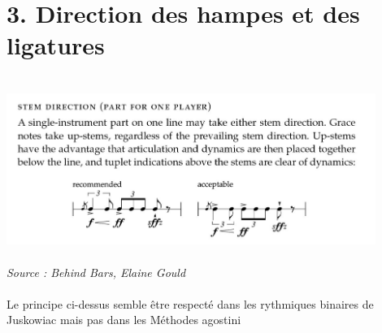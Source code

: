\section*{3. Direction des hampes et des ligatures}
\includegraphics[height=60mm, width=120mm]{images/hampes_0.png} \\\textit{Source : Behind Bars, Elaine Gould}\\\\
Le principe ci-dessus semble être respecté dans les rythmiques binaires de Juskowiac mais pas dans les Méthodes agostini\\

